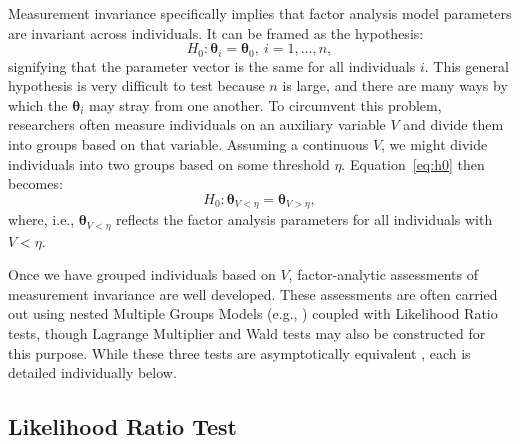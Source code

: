 \documentclass[man]{apa}
\begin{document}
Measurement invariance specifically implies that factor analysis model
parameters are invariant across individuals.  It can be framed as the
hypothesis:
\begin{equation}
    \label{eq:h0}
    H_0: {\bm \theta}_i = {\bm \theta}_0,\ i=1,\ldots,n,
\end{equation}
signifying that the parameter vector is the same for all individuals
$i$.  
This general hypothesis is very difficult to test because $n$ is large, and
there are many ways by which the $\bm{\theta}_i$ may stray from one
another.  To circumvent this problem, researchers often measure
individuals on an auxiliary variable $V$ and divide them into groups
based on that variable.  
Assuming a continuous $V$, we might divide 
individuals into two groups based on some threshold $\eta$.
Equation~\eqref{eq:h0} then becomes:
\begin{equation}
    \label{eq:h0.cut}
    H_0: \bm{\theta}_{V < \eta} = \bm{\theta}_{V > \eta},
\end{equation}
where, i.e., $\bm{\theta}_{V < \eta}$ reflects the factor analysis
parameters for all individuals with $V < \eta$.  

Once we have grouped individuals based on $V$,
factor-analytic assessments
of measurement invariance are well developed.
These assessments are often carried out using nested Multiple Groups
Models (e.g., ) coupled with Likelihood Ratio tests,
though 
Lagrange Multiplier and Wald tests may also be constructed for this
purpose.    While these three tests
are asymptotically equivalent \cite{Sat89}, each is detailed
individually below.








\subsection{Likelihood Ratio Test}
\end{document}
